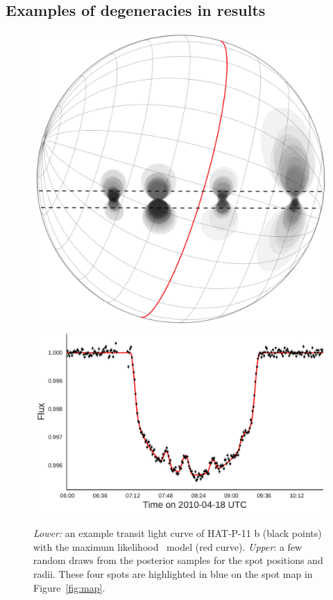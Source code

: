 \subsection{Examples of degeneracies in results}


\begin{figure}
\centering
\includegraphics[scale=0.2]{stsp_hat_p_11/transit063.pdf}
\includegraphics[scale=0.45]{stsp_hat_p_11/lc_063.pdf}
\caption{\textit{Lower:} an example transit light curve of HAT-P-11 b (black points) with the maximum likelihood \stsp\ model (red curve). \textit{Upper}: a few random draws from the posterior samples for the spot positions and radii. These four spots are highlighted in blue on the spot map in Figure~\ref{fig:map}.}
\label{fig:transit_063}
\end{figure}

